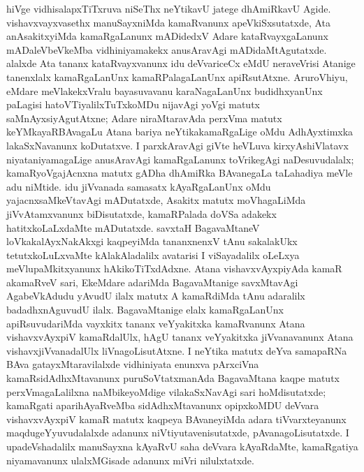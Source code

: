 hiVge vidhisalapxTiTxruva niSeThx neYtikavU jatege dhAmiRkavU Agide. vishavxvayxvasethx manuSayx\-niMda kamaRvanunx apeVkiSxsutatxde, Ata anAsakitxyiMda kamaRgaLanunx mADidedxV Adare kataRvayxgaLanunx mADaleVbeVkeMba vidhiniyamakekx anusAravAgi mADidaMtAgutatxde. alalxde Ata tananx kataRvayxvanunx idu deVvariceCx eMdU neraveVrisi Atanige tanenxlalx kamaR\-gaLanUnx kamaRPalagaLanUnx apiRsutAtxne. AruroVhiyu, eMdare meVlakekxVralu bayasuvavanu karaNagaLanUnx budidhxyanUnx paLagisi hatoVTiyalilxTuTxkoMDu nija\-vAgi yoVgi matutx saMnAyxsiyAgutAtxne; Adare niraMtaravAda perxVma matutx keYMkayaRBAvagaLu Atana bariya neYtikakamaRgaLige oMdu AdhAyxtimxka lakaSxNavanunx koDu\-tatxve. I parxkAravAgi giVte heVLuva kirxyAshiVlatavx niyataniyamagaLige anusAra\-vAgi kamaRgaLanunx toVrikegAgi naDesuvudalalx; kamaRyoVgajAcnxna matutx gADha dhAmiRka BAvanegaLa taLahadiya meVle adu niMtide. idu jiVvanada samasatx kAyaR\-gaLanUnx oMdu yajacnxsaMkeVtavAgi mADutatxde, Asakitx matutx moVhagaLiMda jiVvAtamx\-vanunx biDisutatxde, kamaRPalada doVSa adakekx hatitxkoLaLxdaMte mADutatxde. savxtaH Baga\-vaMtaneV loVkakalAyxNakAkxgi kaqpeyiMda tananxnenxV tAnu sakalakUkx tetutxkoLuLxvaMte kAla\-kAladalilx avatarisi I viSayadalilx oLeLxya meVlupaMkitxyanunx hAkikoTiTxdAdxne. Atana vishavxvAyxpiyAda kamaR akamaRveV sari, EkeMdare adariMda BagavaMtanige savxMtavAgi AgabeVkAdudu yAvudU ilalx matutx A kamaRdiMda tAnu adaralilx badadhxnAgu\-vudU ilalx. BagavaMtanige elalx kamaRgaLanUnx apiRsuvudariMda vayxkitx tananx veYyakitxka kamaR\-vanunx Atana vishavxvAyxpiV kamaRdalUlx, hAgU tananx veYyakitxka jiVvanavanunx Atana vishavx\-jiVvanadalUlx liVnagoLisutAtxne. I neYtika matutx deYva samapaRNa BAva gatayxMtara\-vilalxde vidhiniyata enunxva pArxciVna kamaRsidAdhxMtavanunx puruSoVtatxmanAda Baga\-vaMtana kaqpe matutx perxVmagaLalilxna naMbikeyoMdige vilakaSxNavAgi sari hoMdisutatxde; kamaRgati aparihAyaRveMba sidAdhxMtavanunx opipxkoMDU deVvara vishavxvAyxpiV kamaR matutx kaqpeya BAvaneyiMda adara tiVvarxteyanunx maqdugeYyuvudalalxde adanunx niVtiyutavenisutatxde, pAvanagoLisutatxde. I upadeVshadalilx manuSayxna kAyaRvU saha deVvara kAyaRdaMte, kamaRgatiya niyamavanunx ulalxMGisade adanunx miVri nilulxtatxde.

